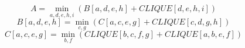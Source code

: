 \documentclass{article}
\begin{document}
$$ A =\min_{ a,d,e,h,i } \left( B\left[a,d,e,h\right]+CLIQUE\left[d,e,h,i\right]\right) $$
$$ B\left[ a,d,e,h \right] =\min_{ c,g } \left( C\left[a,c,e,g\right]+CLIQUE\left[c,d,g,h\right]\right) $$
$$ C\left[ a,c,e,g \right] =\min_{ b,f } \left( CLIQUE\left[b,c,f,g\right]+CLIQUE\left[a,b,e,f\right]\right) $$
\end{document}
